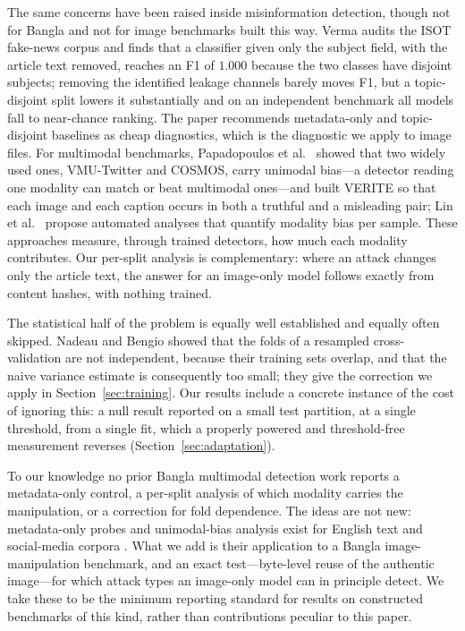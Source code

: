 \documentclass[journal]{IEEEtran}
\begin{document}
The same concerns have been raised inside misinformation detection, though not
for Bangla and not for image benchmarks built this way. Verma \cite{verma}
audits the ISOT fake-news corpus and finds that a classifier given only the
subject field, with the article text removed, reaches an F1 of $1.000$ because
the two classes have disjoint subjects; removing the identified leakage
channels barely moves F1, but a topic-disjoint split lowers it substantially
and on an independent benchmark all models fall to near-chance ranking. The
paper recommends metadata-only and topic-disjoint baselines as cheap
diagnostics, which is the diagnostic we apply to image files. For multimodal
benchmarks, Papadopoulos et al.\ \cite{verite} showed that two widely used
ones, VMU-Twitter and COSMOS, carry unimodal bias---a detector reading one
modality can match or beat multimodal ones---and built VERITE so that each
image and each caption occurs in both a truthful and a misleading pair; Lin et
al.\ \cite{linmodality} propose automated analyses that quantify modality bias
per sample. These approaches measure, through trained detectors, how much each
modality contributes. Our per-split analysis is complementary: where an attack
changes only the article text, the answer for an image-only model follows
exactly from content hashes, with nothing trained.

The statistical half of the problem is equally well established and equally
often skipped. Nadeau and Bengio \cite{nadeau} showed that the folds of a
resampled cross-validation are not independent, because their training sets
overlap, and that the naive variance estimate is consequently too small; they
give the correction we apply in Section~\ref{sec:training}. Our results include
a concrete instance of the cost of ignoring this: a null result reported on a
small test partition, at a single threshold, from a single fit, which a
properly powered and threshold-free measurement reverses
(Section~\ref{sec:adaptation}).

To our knowledge no prior Bangla multimodal detection work reports a
metadata-only control, a per-split analysis of which modality carries the
manipulation, or a correction for fold dependence. The ideas are not new:
metadata-only probes and unimodal-bias analysis exist for English text and
social-media corpora \cite{verma,verite}. What we add is their application to a
Bangla image-manipulation benchmark, and an exact test---byte-level reuse of
the authentic image---for which attack types an image-only model can in
principle detect. We take these to be the minimum reporting standard for
results on constructed benchmarks of this kind, rather than contributions
peculiar to this paper.
\end{document}

